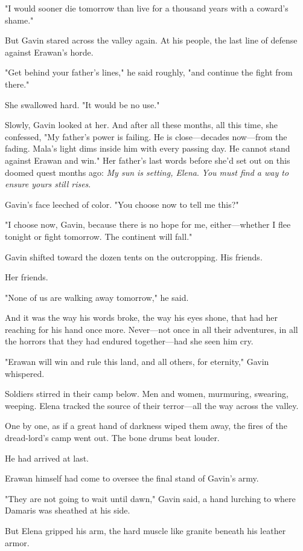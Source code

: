 "I would sooner die tomorrow than live for a thousand years with a coward's shame."

But Gavin stared across the valley again. At his people, the last line of defense against Erawan's horde.

"Get behind your father's lines," he said roughly, "and continue the fight from there."

She swallowed hard. "It would be no use."

Slowly, Gavin looked at her. And after all these months, all this time, she confessed, "My father's power is failing. He is close---decades now---from the fading. Mala's light dims inside him with every passing day. He cannot stand against Erawan and win." Her father's last words before she'd set out on this doomed quest months ago: \emph{My sun is setting, Elena}. \emph{You must find a way to ensure yours still rises}.

Gavin's face leeched of color. "You choose now to tell me this?"

"I choose now, Gavin, because there is no hope for me, either---whether I flee tonight or fight tomorrow. The continent will fall."

Gavin shifted toward the dozen tents on the outcropping. His friends.

Her friends.

"None of us are walking away tomorrow," he said.

And it was the way his words broke, the way his eyes shone, that had her reaching for his hand once more. Never---not once in all their adventures, in all the horrors that they had endured together---had she seen him cry.

"Erawan will win and rule this land, and all others, for eternity," Gavin whispered.

Soldiers stirred in their camp below. Men and women, murmuring, swearing, weeping. Elena tracked the source of their terror---all the way across the valley.

One by one, as if a great hand of darkness wiped them away, the fires of the dread-lord's camp went out. The bone drums beat louder.

He had arrived at last.

Erawan himself had come to oversee the final stand of Gavin's army.

"They are not going to wait until dawn," Gavin said, a hand lurching to where Damaris was sheathed at his side.

But Elena gripped his arm, the hard muscle like granite beneath his leather armor.

